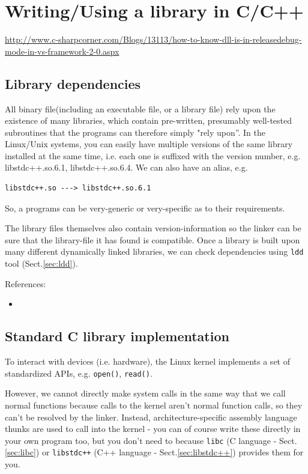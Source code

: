 \chapter{Writing/Using a library in C/C++}

\url{http://www.c-sharpcorner.com/Blogs/13113/how-to-know-dll-is-in-releasedebug-mode-in-vs-framework-2-0.aspx}


\section{Library dependencies}

All binary file(including an executable file, or a library file) rely upon the
existence of many libraries, which contain pre-written, presumably well-tested
subroutines that the programs can therefore simply "rely upon''.
In the Linux/Unix systems, you can easily have multiple versions of the same
library installed at the same time, i.e. each one is suffixed with the version
number, e.g. libstdc++.so.6.1, libstdc++.so.6.4. We can also have an alias, e.g.
\begin{verbatim}
libstdc++.so ---> libstdc++.so.6.1
\end{verbatim}
So, a programs can be very-generic or very-specific as to their requirements. 

The library files themselves also contain version-information so the linker can
be sure that the library-file it has found is compatible.
Once a library is built upon many different dynamically linked libraries, we
can check dependencies using \verb!ldd! tool (Sect.\ref{sec:ldd}).



References:
\begin{itemize}
\item
\end{itemize}

\section{Standard C library implementation}
\label{sec:standard-C-library}


To interact with devices (i.e. hardware), the Linux kernel implements a set of
standardized APIs, e.g. \verb!open()!, \verb!read()!.

However, we cannot directly make system calls in the same way that we call
normal functions because calls to the kernel aren't normal function calls, so they
can't be resolved by the linker. Instead, architecture-specific assembly
language thunks are used to call into the kernel - you can of course write these
directly in your own program too, but you don't need to because \verb!libc! (C
language - Sect.\ref{sec:libc}) or \verb!libstdc++! (C++ language -
Sect.\ref{sec:libstdc++}) provides them for you.

